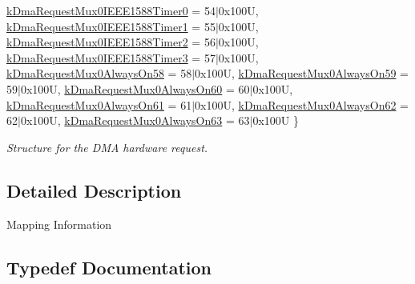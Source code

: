 \begin{DoxyCompactItemize}
\mbox{\hyperlink{group__edma__request_ggafd16b7227cfdebb996c941d293ddd600aa4c0b2a515805edb620dad2c1d258b6b}{k\+Dma\+Request\+Mux0\+I\+E\+E\+E1588\+Timer0}} = 54$\vert$0x100U, 
\mbox{\hyperlink{group__edma__request_ggafd16b7227cfdebb996c941d293ddd600a2e2e82d15daa49be878e27857c425b72}{k\+Dma\+Request\+Mux0\+I\+E\+E\+E1588\+Timer1}} = 55$\vert$0x100U, 
\mbox{\hyperlink{group__edma__request_ggafd16b7227cfdebb996c941d293ddd600ada56f09371c0bdc6b1c4970c63d36edd}{k\+Dma\+Request\+Mux0\+I\+E\+E\+E1588\+Timer2}} = 56$\vert$0x100U, 
\mbox{\hyperlink{group__edma__request_ggafd16b7227cfdebb996c941d293ddd600a3e441b3a8bba0fee5514e905af081bd7}{k\+Dma\+Request\+Mux0\+I\+E\+E\+E1588\+Timer3}} = 57$\vert$0x100U, 
\newline
\mbox{\hyperlink{group__edma__request_ggafd16b7227cfdebb996c941d293ddd600a9fcca8fa9bd20379f291d9f97129c6a2}{k\+Dma\+Request\+Mux0\+Always\+On58}} = 58$\vert$0x100U, 
\mbox{\hyperlink{group__edma__request_ggafd16b7227cfdebb996c941d293ddd600ae23bc92f3686df7c3ed576e6be5dc84a}{k\+Dma\+Request\+Mux0\+Always\+On59}} = 59$\vert$0x100U, 
\mbox{\hyperlink{group__edma__request_ggafd16b7227cfdebb996c941d293ddd600a9c0feedbdd307e2ecf1b118f9aa29b44}{k\+Dma\+Request\+Mux0\+Always\+On60}} = 60$\vert$0x100U, 
\mbox{\hyperlink{group__edma__request_ggafd16b7227cfdebb996c941d293ddd600a47ed5bdb2a57ea0b87fbf4ead12e6513}{k\+Dma\+Request\+Mux0\+Always\+On61}} = 61$\vert$0x100U, 
\newline
\mbox{\hyperlink{group__edma__request_ggafd16b7227cfdebb996c941d293ddd600aecd9228b52a4bf0f713213ce67d2610c}{k\+Dma\+Request\+Mux0\+Always\+On62}} = 62$\vert$0x100U, 
\mbox{\hyperlink{group__edma__request_ggafd16b7227cfdebb996c941d293ddd600a38ed8923b04a5e9c07be7bac63a168cb}{k\+Dma\+Request\+Mux0\+Always\+On63}} = 63$\vert$0x100U
 \}
\begin{DoxyCompactList}\small\item\em Structure for the D\+MA hardware request. \end{DoxyCompactList}\end{DoxyCompactItemize}


\subsection{Detailed Description}
Mapping Information 

\subsection{Typedef Documentation}
\mbox{\label{group__edma__request_ga87fac76863c6c941e6363236dde6f58e}} 
